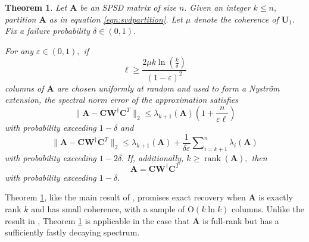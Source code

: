 \documentclass[11pt,letterpaper,twoside,reqno,nosumlimits]{amsart}
\def\pinv{\dagger}
\def\transp{T}
\newcommand{\mat}[1]{\ensuremath{\mathbf{#1}}}
\newcommand{\snorm}[1]{\ensuremath{\big\|#1\big\|_2}}
\DeclareMathOperator{\rank}{rank}
\newtheorem{thm}{Theorem}
\theoremstyle{remark}
\newtheorem{remark}{Remark}
\begin{document}
\begin{thm}
 Let $\mat{A}$ be an SPSD matrix of size $n.$ Given an integer $k \leq n,$ partition $\mat{A}$ as in equation \eqref{eqn:svdpartition}. Let
$\mu$ denote the coherence of $\mat{U}_1.$ Fix a failure probability $\delta \in (0,1).$ 

For any $\varepsilon \in (0,1),$ if
\[
 \ell \geq \frac{2 \mu k \ln\left(\frac{k}{\delta}\right)}{(1-\varepsilon)^2}
\]
columns of $\mat{A}$ are chosen uniformly at random and used to form a Nystr\"om extension, the spectral norm error of the approximation satisfies
\[
\snorm{\mat{A} - \mat{C} \mat{W}^\pinv \mat{C}^\transp} \leq \lambda_{k+1}(\mat{A}) \left(1 + \frac{ n}{\varepsilon \ell} \right) 
\]
with probability exceeding $1-\delta$ and
\[
\snorm{\mat{A} - \mat{C} \mat{W}^\pinv \mat{C}^\transp} \leq \lambda_{k+1}(\mat{A}) + \frac{1}{\delta \varepsilon} \sum\nolimits_{i=k+1}^n \lambda_i(\mat{A})
\]
with probability exceeding $1-2\delta.$
If, additionally, $k \geq \rank(\mat{A}),$ then
\[
 \mat{A} = \mat{C} \mat{W}^\pinv \mat{C}^\transp
\]
with probability exceeding $1-\delta.$

\label{thm:uniformnystromerror}
\end{thm}

 Theorem \ref{thm:uniformnystromerror}, like the main result of \cite{TR10}, promises exact recovery when $\mat{A}$ is exactly rank $k$ and has small coherence, with a sample of $\mathrm{O}(k \ln k)$ columns. Unlike the result in \cite{TR10}, Theorem \ref{thm:uniformnystromerror} is applicable in the case that $\mat{A}$ is full-rank but has a sufficiently fastly decaying spectrum.


\end{document}
